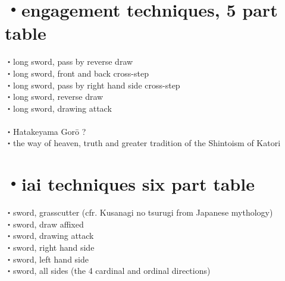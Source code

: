 \documentclass[dvipdfmx, a4paper, 12pt]{utarticle}
\begin{document}
\begin{CJK*}{UTF8}{min}
\begin{landscape}
\section{・engagement techniques, 5 part table}
\noindent {}・long sword, pass by reverse draw\\
・long sword, front and back cross-step\\
・long sword, pass by right hand side cross-step\\
・long sword, reverse draw\\
・long sword, drawing attack\\
\\
・Hatakeyama Gor\={o} ?\\

\setcounter{section}{0}
\newpage
\pagestyle{empty}
・the way of heaven, truth and greater tradition of the Shintoism of Katori\\
\section{・iai techniques six part table}
\noindent {}・sword, grasscutter (cfr. Kusanagi no tsurugi from Japanese mythology)\\
・sword, draw affixed\\
・sword, drawing attack\\
・sword, right hand side\\
・sword, left hand side\\
・sword, all sides (the 4 cardinal and ordinal directions)\\

\end{landscape}
\end{CJK*}
\end{document}
